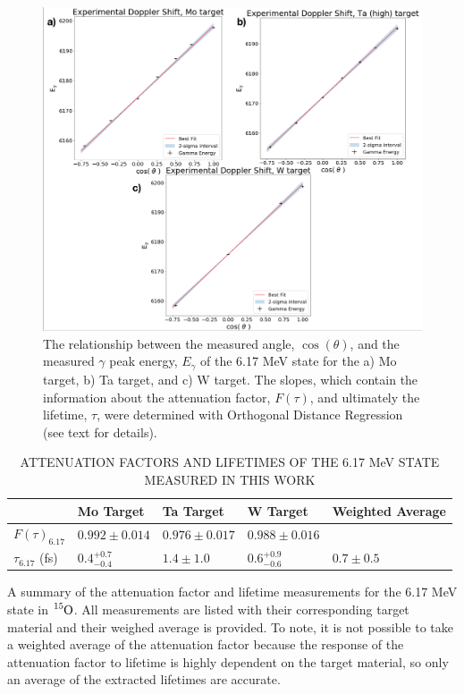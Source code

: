 \begin{figure}
\centering
\includegraphics[width=\linewidth]{figures/doppler617.png}
\caption{The relationship between the measured angle, $\cos(\theta)$, and the measured $\gamma$ peak energy, $E_{\gamma}$ of the 6.17 MeV state for the a) Mo target, b) Ta target, and c) W target. The slopes, which contain the information about the attenuation factor, $F(\tau)$, and ultimately the lifetime, $\tau$, were determined with Orthogonal Distance Regression (see text for details). }
\label{fig: doppler617}
\end{figure}

\begin{table}[]
\caption{ATTENUATION FACTORS AND LIFETIMES OF THE 6.17 MeV STATE MEASURED IN THIS WORK}
\centering
\begin{threeparttable}
\begin{tabular}{@{}lllll@{}}
\toprule
                   & Mo Target & Ta Target & W Target  & Weighted Average \\ \midrule
$F(\tau)_{6.17}$   & $0.992 \pm 0.014$   & $0.976 \pm 0.017$   & $0.988 \pm 0.016$   &                  \\
$\tau_{6.17}$ (fs) & $0.4^{+0.7}_{-0.4}$ & $1.4 \pm 1.0$       & $0.6^{+0.9}_{-0.6}$ & $0.7 \pm 0.5$    \\ \bottomrule
\end{tabular}
\begin{tablenotes}
\small 
\item A summary of the attenuation factor and lifetime measurements for the 6.17 MeV state in $\ce{^{15}O}$. All measurements are listed with their corresponding target material and their weighed average is provided. To note, it is not possible to take a weighted average of the attenuation factor because the response of the attenuation factor to lifetime is highly dependent on the target material, so only an average of the extracted lifetimes are accurate.
\end{tablenotes}
\end{threeparttable}
\label{table: afTau617}
\end{table}

